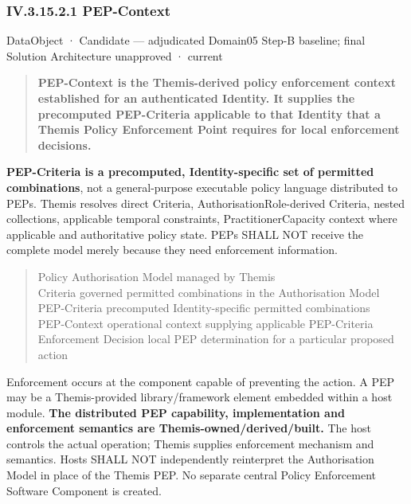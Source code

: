 \subsubsection*{IV.3.15.2.1 PEP-Context}
\label{navigation:IV.3.15.2.1}

\label{element:90c3f7e03448452baec5c425c34fd77a}
{\small DataObject · Candidate — adjudicated Domain05 Step-B baseline; final Solution Architecture unapproved · current}\par

\begin{quote}


\textbf{PEP-Context is the Themis-derived policy enforcement context established for
an authenticated Identity. It supplies the precomputed PEP-Criteria applicable
to that Identity that a Themis Policy Enforcement Point requires for local
enforcement decisions.}



\end{quote}


\textbf{PEP-Criteria is a precomputed, Identity-specific set of permitted combinations},
not a general-purpose executable policy language distributed to PEPs. Themis
resolves direct Criteria, AuthorisationRole-derived Criteria, nested collections,
applicable temporal constraints, PractitionerCapacity context where applicable
and authoritative policy state. PEPs SHALL NOT receive the complete model merely
because they need enforcement information.



\begin{quote}\small\ttfamily
Policy                Authorisation Model managed by Themis\\
Criteria              governed permitted combinations in the Authorisation Model\\
PEP-Criteria          precomputed Identity-specific permitted combinations\\
PEP-Context           operational context supplying applicable PEP-Criteria\\
Enforcement Decision  local PEP determination for a particular proposed action\\

\end{quote}


Enforcement occurs at the component capable of preventing the action. A PEP may
be a Themis-provided library/framework element embedded within a host module.
\textbf{The distributed PEP capability, implementation and enforcement semantics are
Themis-owned/derived/built.} The host controls the actual operation; Themis
supplies enforcement mechanism and semantics. Hosts SHALL NOT independently
reinterpret the Authorisation Model in place of the Themis PEP. No separate
central Policy Enforcement Software Component is created.



